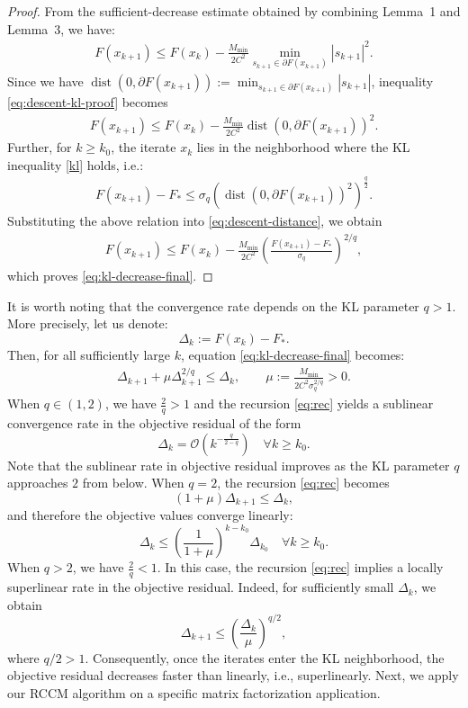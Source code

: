 \documentclass[lettersize,journal]{IEEEtran}
\begin{document}
\begin{proof}
From the sufficient-decrease estimate obtained by combining
Lemma~1 and Lemma~3, we have:
\begin{align}
\label{eq:descent-kl-proof}
F(x_{k+1})
\leq
F(x_k)-
\frac{M_{\min}}{2C^2}
\min_{s_{k+1}\in\partial F(x_{k+1})}
|s_{k+1}|^2.
\end{align}
Since we have
$\operatorname{dist}(0,\partial F(x_{k+1}))
:=
\min_{s_{k+1}\in\partial F(x_{k+1})}
|s_{k+1}|$,
inequality \eqref{eq:descent-kl-proof} becomes
\begin{align}
F(x_{k+1})
\leq
F(x_k)
-
\frac{M_{\min}}{2C^2}
\operatorname{dist}(0,\partial F(x_{k+1}))^2.
\label{eq:descent-distance}
\end{align}
Further, for $k\geq k_0$, the iterate $x_{k}$ lies in the neighborhood
where the KL inequality \eqref{kl} holds, i.e.: 
\begin{align*}
F(x_{k+1})-F_*
\leq
\sigma_q
\left(\operatorname{dist}(0,\partial F(x_{k+1}))^2\right)^{\frac{q}{2}}.
\end{align*}
Substituting the above relation into \eqref{eq:descent-distance}, we obtain
\begin{align*}
F(x_{k+1})
\leq
F(x_k)
-
\frac{M_{\min}}{2C^2}
\left(
\frac{F(x_{k+1})-F_*}{\sigma_q}
\right)^{2/q},
\end{align*}
which proves \eqref{eq:kl-decrease-final}.
\end{proof}

\noindent It is worth noting that the convergence rate depends on the KL parameter $q >1$. More precisely, let us denote:
\[
\Delta_k:=F(x_k)-F_*.
\]
Then, for all sufficiently large $k$, equation \eqref{eq:kl-decrease-final} becomes:
\begin{align}
\Delta_{k+1}+\mu \Delta_{k+1}^{2/q}\leq \Delta_k,
\qquad
\mu:=\frac{M_{\min}}{2C^2\sigma_q^{2/q}}>0.
\label{eq:rec}
\end{align}
When $q\in(1, 2)$, we have $\frac{2}{q}>1$ and the  recursion \eqref{eq:rec} yields a sublinear convergence rate in the objective residual of the form
\[
\Delta_k=\mathcal{O}\left(k^{-\frac{q}{2-q}}\right) \quad \forall k \geq k_0.
\]
Note that the sublinear rate in objective residual improves as the KL parameter $q$ approaches $2$ from below. When $q=2$, the recursion \eqref{eq:rec} becomes
\[
(1+\mu)\Delta_{k+1}\leq \Delta_k,
\]
and therefore the objective values converge linearly:
\[
\Delta_k\leq
\left(\frac{1}{1+\mu}\right)^{k-k_0}\Delta_{k_0} \quad \forall k \geq k_0.
\]
When $q>2$, we have $\frac{2}{q}<1$. In this case, the recursion \eqref{eq:rec} implies a locally superlinear rate in the objective residual. Indeed, for sufficiently small $\Delta_k$, we obtain
\[
\Delta_{k+1}
\leq
\left(\frac{\Delta_k}{\mu}\right)^{q/2},
\]
where $q/2>1$. Consequently, once the iterates enter the KL neighborhood, the objective residual  decreases faster than linearly, i.e., superlinearly. Next, we apply our RCCM algorithm  on a specific matrix
factorization application.
\end{document}
